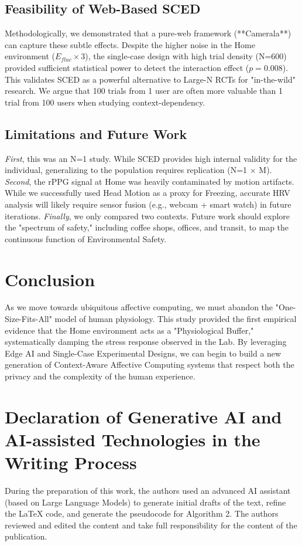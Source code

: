 \documentclass[journal]{IEEEtran}
\begin{document}
\subsection{Feasibility of Web-Based SCED}
Methodologically, we demonstrated that a pure-web framework (**Camerala**) can capture these subtle effects.
Despite the higher noise in the Home environment ($E_{fluc} \times 3$), the single-case design with high trial density (N=600) 
provided sufficient statistical power to detect the interaction effect ($p=0.008$).
This validates SCED as a powerful alternative to Large-N RCTs for "in-the-wild" research. 
We argue that 100 trials from 1 user are often more valuable than 1 trial from 100 users when studying context-dependency.

\subsection{Limitations and Future Work}
\textit{First}, this was an N=1 study. While SCED provides high internal validity for the individual, generalizing to the population requires replication (N=1 $\times$ M).
\textit{Second}, the rPPG signal at Home was heavily contaminated by motion artifacts. 
While we successfully used Head Motion as a proxy for Freezing, accurate HRV analysis will likely require sensor fusion (e.g., webcam + smart watch) in future iterations.
\textit{Finally}, we only compared two contexts. Future work should explore the "spectrum of safety," including coffee shops, offices, and transit, 
to map the continuous function of Environmental Safety.

\section{Conclusion}
As we move towards ubiquitous affective computing, we must abandon the "One-Size-Fits-All" model of human physiology. 
This study provided the first empirical evidence that the Home environment acts as a "Physiological Buffer," systematically damping the stress response 
observed in the Lab. By leveraging Edge AI and Single-Case Experimental Designs, we can begin to build a new generation of 
Context-Aware Affective Computing systems that respect both the privacy and the complexity of the human experience.

\section*{Declaration of Generative AI and AI-assisted Technologies in the Writing Process}
During the preparation of this work, the authors used an advanced AI assistant (based on Large Language Models) to generate initial drafts of the text, refine the LaTeX code, and generate the pseudocode for Algorithm 2. The authors reviewed and edited the content and take full responsibility for the content of the publication.
\end{document}
